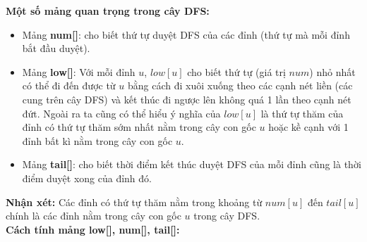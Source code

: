 \documentclass{article}
\begin{document}
\textbf{Một số mảng quan trọng trong cây DFS:}

\begin{itemize}
    \item Mảng \textbf{num[]}: cho biết thứ tự duyệt DFS của các đỉnh (thứ tự mà mỗi đỉnh bắt đầu duyệt).
    \item Mảng \textbf{low[]}: Với mỗi đỉnh $u$, $low[u]$ cho biết thứ tự (giá trị $num$) nhỏ nhất có thể đi đến được từ $u$ bằng cách đi xuôi xuống theo các cạnh nét liền (các cung trên cây DFS) và kết thúc đi ngược lên không quá 1 lần theo cạnh nét đứt. Ngoài ra ta cũng có thể hiểu ý nghĩa của $low[u]$ là thứ tự thăm của đỉnh có thứ tự thăm sớm nhất nằm trong cây con gốc $u$ hoặc kề cạnh với 1 đỉnh bất kì nằm trong cây con gốc $u$.
    \item Mảng \textbf{tail[]}: cho biết thời điểm kết thúc duyệt DFS của mỗi đỉnh cũng là thời điểm duyệt xong của đỉnh đó.
\end{itemize}

\noindent\textbf{Nhận xét:} Các đỉnh có thứ tự thăm nằm trong khoảng từ $num[u]$ đến $tail[u]$ chính là các đỉnh nằm trong cây con gốc $u$ trong cây DFS.\\

\textbf{Cách tính mảng low[], num[], tail[]:}
\end{document}
